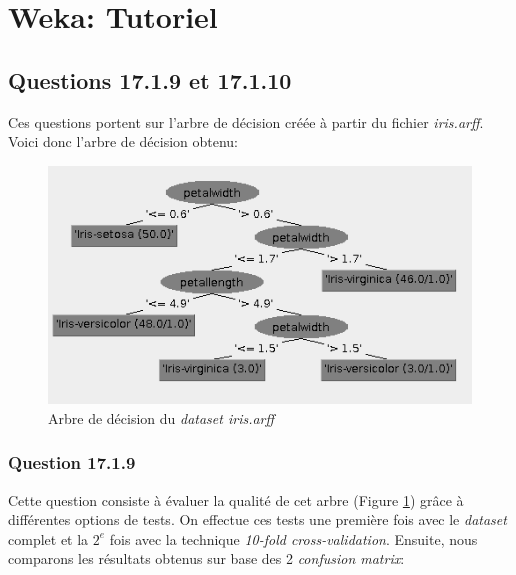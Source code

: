 \documentclass[11pt,a4paper]{article}
\begin{document}
   	
   	\section{Weka: Tutoriel}
   	
	   	\subsection{Questions 17.1.9 et 17.1.10}
		   	Ces questions portent sur l'arbre de décision créée à partir du fichier \textit{iris.arff}. Voici donc l'arbre de décision obtenu:
		   	
		   	\begin{figure}[h]
		   		\begin{center}
		   			\includegraphics[width=0.5\linewidth]{IrisTree}
		   		\end{center}
		   		\caption{Arbre de décision du \textit{dataset iris.arff}}
		   		\label{fig-Iris-tree}
		   	\end{figure}
		   	
		   	\subsubsection*{Question 17.1.9}
			   	Cette question consiste à évaluer la qualité de cet arbre (Figure \ref{fig-Iris-tree}) grâce à différentes options de tests. On effectue ces tests une première fois avec le \textit{dataset} complet et la $2^{e}$ fois avec la technique \textit{10-fold cross-validation}. Ensuite, nous comparons les résultats obtenus sur base des 2 \textit{confusion matrix}:\\
	   			
\end{document}
